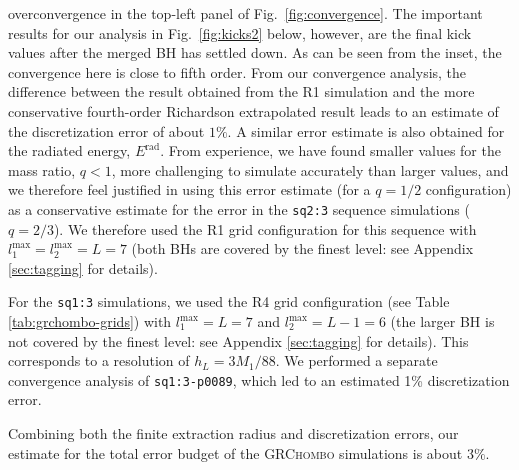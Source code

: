 \documentclass[floats,floatfix,showpacs,amssymb,prd,twocolumn,superscriptaddress,nofootinbib,nolongbibliography,reprint]{revtex4-2}
\newcommand{\mr}[1]{{\textcolor{cyan}{\sf{[MR: #1]}} }}
\newcommand{\us}[1]{{\textcolor{teal}{\sf{[US: #1]}} }}
\newcommand{\eb}[1]{{\textcolor{blue}{\sf{[EB: #1]}} }}
\newcommand{\rad}{\mathrm{rad}}
\begin{document}
overconvergence
in the top-left panel of Fig.~\ref{fig:convergence}.
The important results for our analysis in Fig.~\ref{fig:kicks2} below,
however, are the final kick values after the merged BH has settled down.
As can be seen from the inset, the convergence here is close to 
fifth order. 
From our convergence 
analysis, the difference between the result obtained from the R1 simulation 
and the more conservative fourth-order Richardson extrapolated result leads 
to an estimate of the discretization error of about $1\%$. A similar error 
estimate is also obtained for the radiated energy, $E^{\rad}$.
From experience, we have found smaller values for the mass ratio, $q<1$, 
more challenging to simulate accurately than larger values, and we 
therefore feel justified in using this error estimate (for a $q=1/2$ 
configuration) as a conservative estimate for the error in the 
\texttt{sq2:3} sequence simulations ($q=2/3$). We therefore used the R1 grid
configuration for this sequence with  $l_1^{\max}=l_2^{\max}=L=7$ 
(both BHs are covered by 
the finest level: see Appendix \ref{sec:tagging} for details).

For the \texttt{sq1:3} simulations, we used the R4 grid configuration
(see Table \ref{tab:grchombo-grids}) with $l_1^{\max}=L=7$ and
$l_2^{\max}=L-1=6$ (the larger BH is not covered by the finest level:
see Appendix \ref{sec:tagging} for details). This corresponds to a
resolution of $h_L=3M_1/88$. We performed a separate convergence
analysis of \texttt{sq1:3-p0089}, which led to an estimated 1\%
discretization error.

Combining both the finite extraction radius and discretization errors, 
our estimate for the total error budget of the \textsc{GRChombo} 
simulations is about $3\%$.
\end{document}
